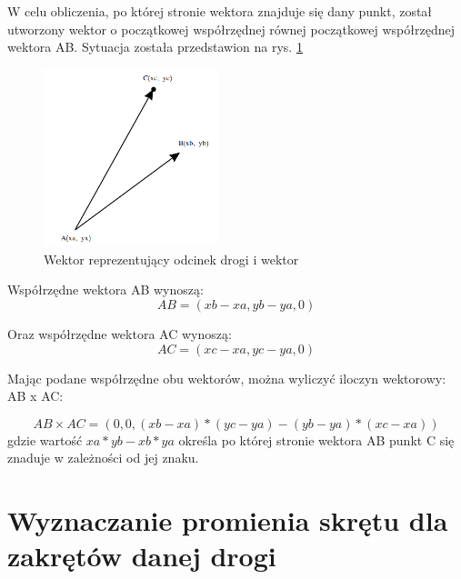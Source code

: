 W celu obliczenia, po której stronie wektora znajduje się dany punkt, został utworzony wektor o początkowej współrzędnej równej początkowej współrzędnej wektora AB. Sytuacja została przedstawion na rys. \ref{sec:VectorVector}


\begin{figure}[h]
\caption{Wektor reprezentujący odcinek drogi i wektor}
\label{sec:VectorVector}
\centering
\includegraphics[width=0.45\textwidth]{vectorVector}
\end{figure}

Współrzędne wektora AB wynoszą:
\begin{equation}
AB = (xb - xa, yb - ya, 0)
\end{equation}


Oraz współrzędne wektora AC wynoszą:
\begin{equation}
AC = (xc - xa, yc - ya, 0)
\end{equation}

Mając podane współrzędne obu wektorów, można wyliczyć iloczyn wektorowy: AB x AC:

\begin{equation}
AB \times AC = (0, 0, (xb - xa) * (yc - ya) - (yb - ya) * (xc - xa))
\end{equation}
gdzie wartość $xa * yb - xb * ya$ określa po której stronie wektora AB punkt C się znaduje w zależności od jej znaku. 

\section{Wyznaczanie promienia skrętu dla zakrętów danej drogi}
\label{sec:WyznaczaniePromieniaSkrętuDlaZakrętówDanejDrogi}

